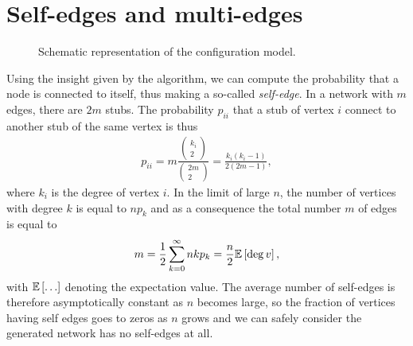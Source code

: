 \documentclass[
11pt, %
english, %
singlespacing, %
nolistspacing, %
liststotoc, %
headsepline, %
]{MastersDoctoralThesis} %
\begin{document}
\section{Self-edges and multi-edges}

\begin{figure}
	
	\caption{Schematic representation of the configuration model.}
	\label{Figure: Configuration model}
\end{figure}

Using the insight given by the algorithm, we can compute the probability that a node is connected to itself, thus making a so-called \emph{self-edge}. In a network with $m$ edges, there are $2 m$ stubs. The probability $p_{ii}$ that a stub of vertex $i$ connect to another stub of the same vertex is thus
\begin{align}
	p_{ii} = m \frac{ \begin{pmatrix} k_i \\ 2 \end{pmatrix} }{ \begin{pmatrix} 2m \\ 2 \end{pmatrix} } = \frac{k_i (k_i - 1)}{2 (2m - 1)},
\end{align}
where $k_i$ is the degree of vertex $i$. In the limit of large $n$, the number of vertices with degree $k$ is equal to $n p_k$ and as a consequence the total number $m$ of edges is equal to
\begin{align}
	m = \frac{1}{2} \sum_{k = 0}^\infty n k p_k = \frac{n}{2} \mathbb{E}\left[ \deg{v} \right],
\end{align}
with $\expected{\dots}$ denoting the expectation value. The average number of self-edges is therefore asymptotically constant as $n$ becomes large, so the fraction of vertices having self edges goes to zeros as $n$ grows and we can safely consider the generated network has no self-edges at all.
\end{document}
